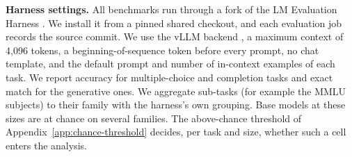 \textbf{Harness settings.} All benchmarks run through a fork of the LM Evaluation Harness \citep{gao_framework_2021}. We install it from a pinned shared checkout, and each evaluation job records the source commit. We use the vLLM backend \citep{kwon_efficient_2023}, a maximum context of 4,096 tokens, a beginning-of-sequence token before every prompt, no chat template, and the default prompt and number of in-context examples of each task. We report accuracy for multiple-choice and completion tasks and exact match for the generative ones. We aggregate sub-tasks (for example the MMLU subjects) to their family with the harness's own grouping. Base models at these sizes are at chance on several families. The above-chance threshold of Appendix~\ref{app:chance-threshold} decides, per task and size, whether such a cell enters the analysis.


